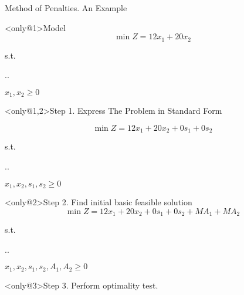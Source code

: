 \begin{frame}{Method of Penalties. An Example}{}


  \begin{block}<only@1>{Model}
\[     \min Z = 12x_1 + 20x_2\]

{\centering
  s.t.

  \sysdelim..%

$    x_1, x_2  \geq 0$
\par}
  \end{block}
\begin{block}<only@1,2>{Step 1. Express The Problem in Standard Form} \justifying

  \[\min Z = 12x_1 + 20x_2 + 0s_1 + 0s_2\]

  {\centering
    s.t.

    \sysdelim..%

$    x_1, x_2, s_1, s_2  \geq 0$
\par}
\end{block}

\begin{block}<only@2>{Step 2. Find initial basic feasible solution} \justifying
    \[\min Z = 12x_1 + 20x_2 + 0s_1 + 0s_2 +MA_1 + MA_2\]

    {\centering
      s.t.

      \sysdelim..%

$    x_1, x_2, s_1, s_2, A_1, A_2   \geq 0$
\par}
\end{block}

\begin{block}<only@3>{Step 3. Perform optimality test.} \justifying
  {\centering
  \par}
\end{block}


\end{frame}
